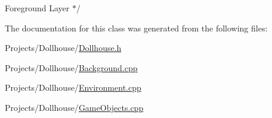 \begin{DoxyItemize}
\item Foreground Layer $\ast$/ 
\end{DoxyItemize}

The documentation for this class was generated from the following files\-:\begin{DoxyCompactItemize}
\item 
Projects/\-Dollhouse/\hyperlink{Dollhouse_8h}{Dollhouse.\-h}\item 
Projects/\-Dollhouse/\hyperlink{Background_8cpp}{Background.\-cpp}\item 
Projects/\-Dollhouse/\hyperlink{Environment_8cpp}{Environment.\-cpp}\item 
Projects/\-Dollhouse/\hyperlink{GameObjects_8cpp}{Game\-Objects.\-cpp}\end{DoxyCompactItemize}
